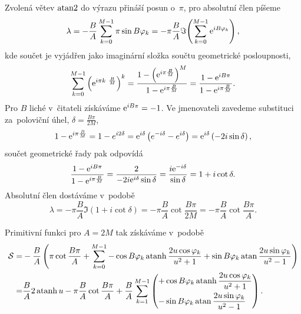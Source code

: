 Zvolená větev $\operatorname{atan2}$ do výrazu přináší posun o~$\pi$, pro absolutní člen píšeme 
\begin{equation}
    \lambda = -\frac{B}{A}\sum_{k=0}^{M-1}\pi\sin B \varphi_k=-\pi\frac{B}{A}\Im\!\left(\sum_{k=0}^{M-1}\mathrm{e}^{iB\varphi_k }\right),
\end{equation}
kde součet je vyjádřen jako imaginární složka součtu geometrické posloupnosti,
\begin{equation}
    \sum_{k=0}^{M-1}\left(\mathrm{e}^{i\pi k~\frac{B}{M}}\right)^k=\frac{1-\left(\mathrm{e}^{i\pi\frac{B}{M}}\right)^M}{1-\mathrm{e}^{i\pi\frac{B}{M}}}=\frac{1-\mathrm{e}^{iB\pi}}{1-\mathrm{e}^{i\pi\frac{B}{M}}}.
\end{equation}
Pro $B$ liché v~čitateli získáváme $\mathrm{e}^{iB\pi}=-1$. Ve jmenovateli zavedeme substituci za~poloviční úhel, $\delta = \frac{B\pi}{2M}$,
\begin{equation}
    1-\mathrm{e}^{i\pi\frac{B}{M}}=1-e^{i2\delta}=\mathrm{e}^{i\delta}\left(e^{-i\delta}-e^{i\delta}\right)=\mathrm{e}^{i\delta}\left(-2i\sin{\delta}\right),
\end{equation}
součet geometrické řady pak odpovídá
\begin{equation}
    \frac{1-\mathrm{e}^{iB\pi}}{1-\mathrm{e}^{i\pi\frac{B}{M}}}=\frac{2}{-2i\mathrm{e}^{i\delta}\sin{\delta}}=\frac{i\mathrm{e}^{-i\delta}}{\sin{\delta}}=1+i\cot{\delta}.
\end{equation}
Absolutní člen dostáváme v~podobě
\begin{equation}
    \lambda=-\pi\frac{B}{A}\Im\left(1+i\cot{\delta}\right)=-\pi\frac{B}{A}\cot\frac{B\pi}{2M}=-\pi\frac{B}{A}\cot\frac{B\pi}{A}.
\end{equation}

Primitivní funkci pro $A=2M$ tak získáváme v~podobě
\begin{align}
    \mathcal{S}=&-\frac{B}{A}\left(\pi\cot\frac{B\pi}{A}+\sum_{k=0}^{M-1}-\cos{B\varphi_k}\operatorname{atanh}\frac{2u\cos{\varphi_k}}{u^2+1}+\sin{B\varphi_k}\operatorname{atan}{\frac{2u\sin{\varphi_k}}{u^2-1}}\right)\nonumber\\
    =&\frac{B}{A}2\operatorname{atanh}{u}-\pi\frac{B}{A}\cot{\frac{B\pi}{A}}+\frac{B}{A}\sum_{k=1}^{M-1}\left(\begin{aligned}+&\cos{B\varphi_k}\operatorname{atanh}\frac{2u\cos{\varphi_k}}{u^2+1}\\-&\sin{B\varphi_k}\operatorname{atan}{\frac{2u\sin{\varphi_k}}{u^2-1}}\end{aligned}\right).
\end{align}

